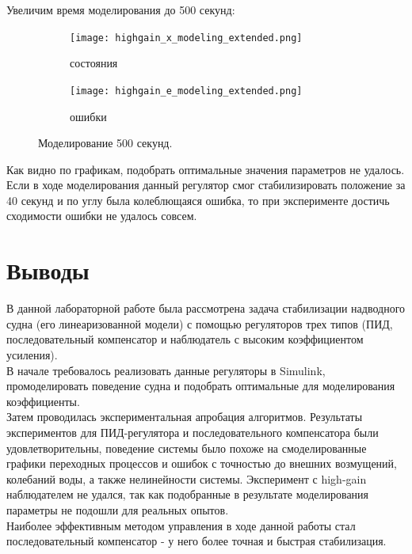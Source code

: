 \documentclass[12pt]{article}
\begin{document}
Увеличим время моделирования до 500 секунд:
\begin{figure}[H]
    \centering
    \begin{subfigure}{0.49\textwidth}
        \centering
        \texttt{[image: highgain\_x\_modeling\_extended.png]}
        \caption{состояния}
         \label{fig:highgain_x_modeling_extended.png}
     \end{subfigure}
     \hfill
     \begin{subfigure}{0.49\textwidth}
         \centering
         \texttt{[image: highgain\_e\_modeling\_extended.png]}
         \caption{ошибки}
         \label{fig:highgain_e_modeling_extended.png}
     \end{subfigure}
    \caption{Моделирование 500 секунд.}
    \label{fig:two graphs}
\end{figure}

Как видно по графикам, подобрать оптимальные значения параметров не удалось. Если в ходе моделирования данный регулятор смог стабилизировать положение за 40 секунд и по углу была колеблющаяся ошибка, то при эксперименте достичь сходимости ошибки не удалось совсем.\\

\section*{Выводы}
В данной лабораторной работе была рассмотрена задача стабилизации надводного судна (его линеаризованной модели) с помощью регуляторов трех типов (ПИД, последовательный компенсатор и наблюдатель с высоким коэффициентом усиления).\\
В начале требовалось реализовать данные регуляторы в Simulink, промоделировать поведение судна и подобрать оптимальные для моделирования коэффициенты.\\
Затем проводилась экспериментальная апробация алгоритмов. Результаты экспериментов для ПИД-регулятора и последовательного компенсатора были удовлетворительны, поведение системы было похоже на смоделированные графики переходных процессов и ошибок с точностью до внешних возмущений, колебаний воды, а также нелинейности системы. Эксперимент с high-gain наблюдателем не удался, так как подобранные в результате моделирования параметры не подошли для реальных опытов.\\
Наиболее эффективным методом управления в ходе данной работы стал последовательный компенсатор - у него более точная и быстрая стабилизация.
\end{document}
